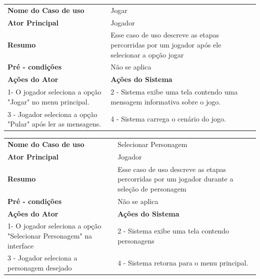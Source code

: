 \begin{table}	
\centering
{}
\begin{tabular}{ | m{5cm} | m{8cm}| } 
\hline
\textbf {Nome do Caso de uso} & Jogar \\ 

\textbf {Ator Principal} & Jogador \\ 
\textbf {Resumo} & Esse caso de uso descreve as etapas percorridas por um jogador após ele selecionar a opção jogar \\
\textbf {Pré - condições} & Não se aplica\\
\hline
\textbf {Ações do Ator} & \textbf {Ações do Sistema}\\
\hline
1- O jogador seleciona a opção "Jogar" no menu principal. & 2 - Sistema exibe uma tela contendo uma mensagem informativa sobre o jogo.\\
3 - Jogador seleciona a opção "Pular" após ler as mensagens. & 4 - Sistema carrega o cenário do jogo.\\
\hline
\end{tabular}
\end{table}

\begin{table}	
\centering
{}
\begin{tabular}{ | m{5cm} | m{8cm}| } 
\hline
\textbf {Nome do Caso de uso} & Selecionar Personagem \\ 

\textbf {Ator Principal} & Jogador \\ 
\textbf {Resumo} & Esse caso de uso descreve as etapas percorridas por um jogador durante a seleção de personagem \\
\textbf {Pré - condições} & Não se aplica\\
\hline
\textbf {Ações do Ator} & \textbf {Ações do Sistema}\\
\hline
1- O jogador seleciona a opção "Selecionar Personagem" na interface & 2 - Sistema exibe uma tela contendo personagens\\
3 - Jogador seleciona a personagem desejado & 4 - Sistema retorna para o menu principal.\\
\hline
\end{tabular}
\end{table}

